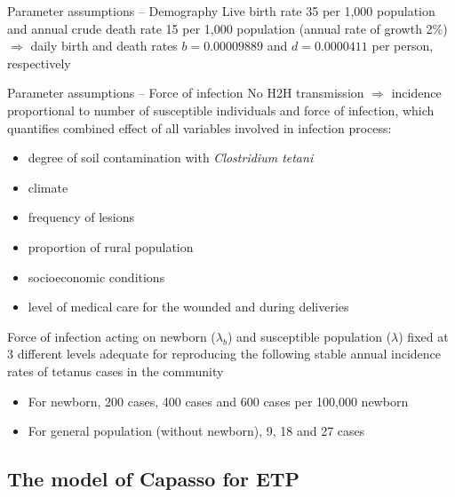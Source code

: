 \documentclass[aspectratio=169]{beamer}
\begin{document}
\begin{frame}{Parameter assumptions -- Demography}
  Live birth rate 35 per 1,000 population and annual crude death rate 15 per 1,000 population (annual rate of growth 2\%) $\Rightarrow$ daily birth and death rates $b=0.00009889$ and $d=0.0000411$ per person, respectively
\end{frame}

\begin{frame}{Parameter assumptions -- Force of infection}
  No H2H transmission $\Rightarrow$ incidence proportional to number of susceptible individuals and force of infection, which quantifies combined effect of all variables involved in infection process:
  \begin{itemize}
    \item degree of soil contamination with \emph{Clostridium tetani}
    \item climate
    \item frequency of lesions
    \item proportion of rural population
    \item socioeconomic conditions
    \item level of medical care for the wounded and during deliveries
  \end{itemize}
\end{frame}

\begin{frame}
  Force of infection acting on newborn ($\lambda_b$) and susceptible population ($\lambda$) fixed at 3 different levels adequate for reproducing the following stable annual incidence rates of tetanus cases in the community
  \begin{itemize}
    \item For newborn, 200 cases, 400 cases and 600 cases per 100,000 newborn
    \item For general population (without newborn), 9, 18 and 27 cases
  \end{itemize}
\end{frame}


\subsection{The model of Capasso for ETP}
\end{document}
